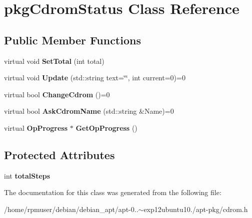 \section{pkg\-Cdrom\-Status \-Class \-Reference}
\label{classpkgCdromStatus}
\subsection*{\-Public \-Member \-Functions}
\begin{DoxyCompactItemize}
\item 
virtual void {\bfseries \-Set\-Total} (int total)\label{classpkgCdromStatus_a89a757dbff2ea649c59a2318a5fc3736}

\item 
virtual void {\bfseries \-Update} (std\-::string text=\char`\"{}\char`\"{}, int current=0)=0\label{classpkgCdromStatus_a92619bb6941ed2ca67be55b8a4ac09f4}

\item 
virtual bool {\bfseries \-Change\-Cdrom} ()=0\label{classpkgCdromStatus_a39e4e477ae35bdfafcecd6b1acd716a7}

\item 
virtual bool {\bfseries \-Ask\-Cdrom\-Name} (std\-::string \&\-Name)=0\label{classpkgCdromStatus_a8c2b0f4c5306f2574a0ea2a5d7e48fbe}

\item 
virtual {\bf \-Op\-Progress} $\ast$ {\bfseries \-Get\-Op\-Progress} ()\label{classpkgCdromStatus_a725cccead63ff595aa2fc4f6210c90e7}

\end{DoxyCompactItemize}
\subsection*{\-Protected \-Attributes}
\begin{DoxyCompactItemize}
\item 
int {\bfseries total\-Steps}\label{classpkgCdromStatus_a13ec94e768d6d7dbe50f9fb8a7b0337f}

\end{DoxyCompactItemize}


\-The documentation for this class was generated from the following file\-:\begin{DoxyCompactItemize}
\item 
/home/rpmuser/debian/debian\-\_\-apt/apt-\/0..$\sim$exp12ubuntu10./apt-\/pkg/cdrom.\-h\end{DoxyCompactItemize}
